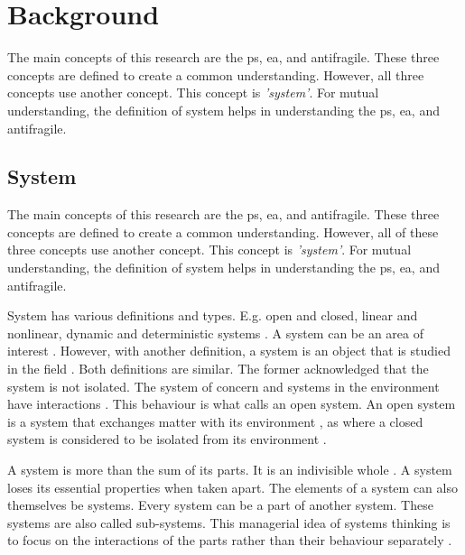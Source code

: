\chapter{Background}
\label{ch:theoreticalbackground}
The main concepts of this research are the \gls{ps}, \acrlong{ea}, and \gls{antifragile}. These three concepts are defined to create a common understanding. However, all three concepts use another concept. This concept is \textit{'system'}. For mutual understanding, the definition of system helps in understanding the \gls{ps}, \acrfull{ea}, and \gls{antifragile}.

\section{System}
\label{sec:tbsystem}
The main concepts of this research are the \gls{ps}, \acrlong{ea}, and \gls{antifragile}. These three concepts are defined to create a common understanding. However, all of these three concepts use another concept. This concept is \textit{'system'}. For mutual understanding, the definition of system helps in understanding the \gls{ps}, \acrfull{ea}, and \gls{antifragile}.

System has various definitions and types. E.g. open and closed, linear and nonlinear, dynamic and deterministic systems \textcite{Rickles2007}. A system can be an area of interest \textcite[p.~13]{Mannaert2016}. However, with another definition, a system is an object that is studied in the field \textcite[p.~933]{Rickles2007}. Both definitions are similar. The former acknowledged that the system is not isolated. The system of concern and systems in the environment have interactions \parencite[p.~13--14]{Mannaert2016}. This behaviour is what \textcite[p.~32]{Bertalanffy1968} calls an open system. An open system is a system that exchanges matter with its environment \parencite[p.~32]{Bertalanffy1968}, as where a closed system is considered to be isolated from its environment \parencite[p.~39]{Bertalanffy1968}.

A system is more than the sum of its parts. It is an indivisible whole \parencites[p.~51--69]{Ackoff1964}[p.~664]{Ackoff1973}. A system loses its essential properties when taken apart. The elements of a system can also themselves be systems. Every system can be a part of another system. These systems are also called sub-systems. This managerial idea of systems thinking is to focus on the interactions of the parts rather than their behaviour separately \parencite{Ackoff1964}. 

